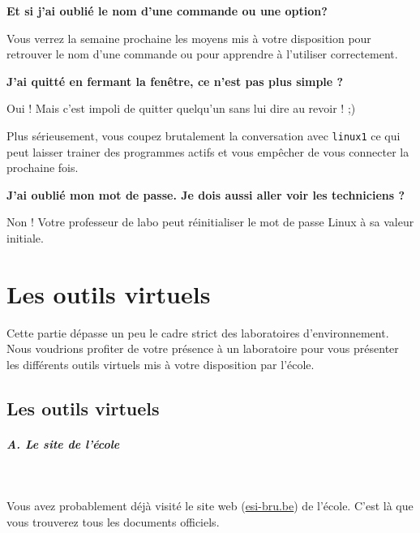 \documentclass[a4paper,11pt]{article}
\begin{document}
\par
 \textbf{Et si j'ai oubli\'e le nom d'une commande ou une option?}
 \par
         
Vous verrez la semaine prochaine les moyens mis \`a votre disposition pour retrouver le nom d'une commande ou pour apprendre \`a l'utiliser correctement.
						
 \par
\textbf{J'ai quitt\'e en fermant la fen\^etre, ce n'est pas plus simple ?}
\par
        
Oui ! Mais c'est impoli de quitter quelqu'un sans lui dire au revoir ! ;) 
						
\par
Plus s\'erieusement, vous coupez brutalement la conversation avec \verb_linux1_ ce qui peut laisser trainer des programmes actifs et vous emp\^echer de vous connecter la prochaine fois.
						
\par
 \textbf{J'ai oubli\'e mon mot de passe. Je dois aussi aller voir les techniciens ?}
 \par
        
Non ! Votre professeur de labo peut r\'einitialiser le mot de passe Linux \`a sa valeur initiale.
						
 \par

\section{Les outils virtuels}
Cette partie d\'epasse un peu le cadre strict des laboratoires d'environnement. Nous voudrions profiter de votre pr\'esence \`a un laboratoire pour vous pr\'esenter les diff\'erents outils virtuels mis \`a votre disposition par l'\'ecole.
\par

\subsection{Les outils virtuels}
\subparagraph{A. Le site de l'\'ecole} 
		
\textcolor{white}{.} \par
				
Vous avez probablement d\'ej\`a visit\'e le site web (\url{esi-bru.be}) de l'\'ecole. C'est l\`a que vous trouverez tous les documents officiels.
			
\end{document}
